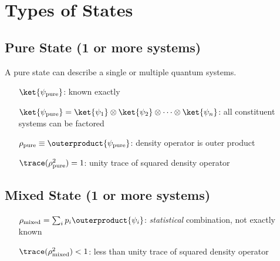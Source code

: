 \section*{Types of States}
\subsection*{Pure State (1 or more systems)}
A pure state can describe a single or multiple quantum systems.
\begin{itemize}
\item [$\ket{\psi_{\text{pure}}}$:] known exactly
\item [$\ket{\psi_{\text{pure}}} = \ket{\psi_1}\otimes\ket{\psi_2}\otimes
  \dotsm \otimes \ket{\psi_n}$:] all constituent systems can be factored 
\item [$\rho_{\text{pure}} \equiv \outerproduct{\psi_{\text{pure}}}$:] density operator is outer product
\item [$\trace(\rho_{\text{pure}}^2) = 1$:] unity trace of squared density operator
\end{itemize}

\subsection*{Mixed State (1 or more systems)}
\begin{itemize}
\item [$\rho_{\text{mixed}} = \sum_i p_i\outerproduct{\psi_i}$:]
  \emph{statistical} combination, not exactly known
\item [$\trace(\rho_{\text{mixed}}^2) < 1$:] less than unity trace of squared density operator
\end{itemize}

